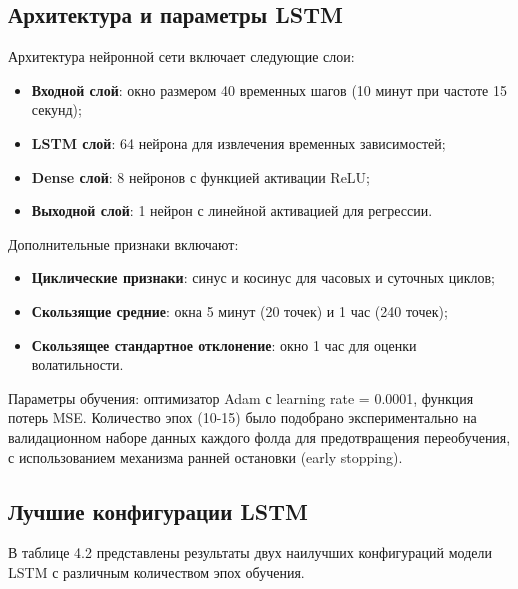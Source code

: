 \subsection{Архитектура и параметры LSTM}

\hspace*{1.25cm}Архитектура нейронной сети включает следующие слои:
\begin{itemize}
	\item \textbf{Входной слой}: окно размером 40 временных шагов (10 минут при частоте 15 секунд);
	\item \textbf{LSTM слой}: 64 нейрона для извлечения временных зависимостей;
	\item \textbf{Dense слой}: 8 нейронов с функцией активации ReLU;
	\item \textbf{Выходной слой}: 1 нейрон с линейной активацией для регрессии.
\end{itemize}

\hspace*{1.25cm}Дополнительные признаки включают:
\begin{itemize}
	\item \textbf{Циклические признаки}: синус и косинус для часовых и суточных циклов;
	\item \textbf{Скользящие средние}: окна 5 минут (20 точек) и 1 час (240 точек);
	\item \textbf{Скользящее стандартное отклонение}: окно 1 час для оценки волатильности.
\end{itemize}

\hspace*{1.25cm}Параметры обучения: оптимизатор Adam с learning rate = 0.0001, функция потерь MSE. Количество эпох (10-15) было подобрано экспериментально на валидационном наборе данных каждого фолда для предотвращения переобучения, с использованием механизма ранней остановки (early stopping).

\subsection{Лучшие конфигурации LSTM}

\hspace*{1.25cm}В таблице 4.2 представлены результаты двух наилучших конфигураций модели LSTM с различным количеством эпох обучения.

